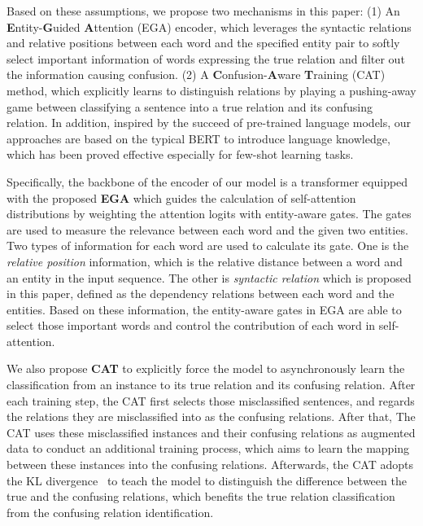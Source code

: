 \documentclass[11pt]{article}
\begin{document}
Based on these assumptions, we propose two mechanisms in this paper:
(1) An \textbf{E}ntity-\textbf{G}uided \textbf{A}ttention (EGA) encoder, which leverages the syntactic relations and relative positions between each word and the specified entity pair to
softly select important information of words expressing the true relation and filter out the information causing confusion.
(2) A \textbf{C}onfusion-\textbf{A}ware \textbf{T}raining (CAT) method, which explicitly learns to distinguish relations by playing a pushing-away game between classifying a sentence into a true relation and its confusing relation.
In addition, inspired by the succeed of pre-trained language models, our approaches are based on the typical BERT \cite{devlin2018bert} to introduce language knowledge, which has been proved effective especially for few-shot learning tasks.


Specifically, the backbone of the encoder of our model is a transformer equipped with the proposed \textbf{EGA} which guides the calculation of self-attention distributions by weighting the attention logits with entity-aware gates.
The gates are used to measure the relevance between each word and the given two entities.
Two types of information for each word are used to calculate its gate.
One is the \textit{relative position} \cite{Zeng2015DistantSF} information, which is the relative distance between a word and an entity in the input sequence.
The other is \textit{syntactic relation} which is proposed in this paper, defined as the dependency relations between each word and the entities.
Based on these information, the entity-aware gates in EGA are able to select those important words and control the contribution of each word in self-attention.


We also propose \textbf{CAT} to explicitly force the model to asynchronously learn the classification from an instance to its true relation and its confusing relation.
After each training step, the CAT first selects those misclassified sentences, and regards the relations they are misclassified into as the confusing relations.
After that, The CAT uses these misclassified instances and their confusing relations as augmented data to conduct an additional training process, which aims to learn the mapping between these instances into the confusing relations. 
Afterwards, the CAT adopts the KL divergence~\cite{10.2307/2236703} to teach the model to distinguish the difference between the true and the confusing relations, which benefits the true relation classification from the confusing relation identification.
\end{document}
